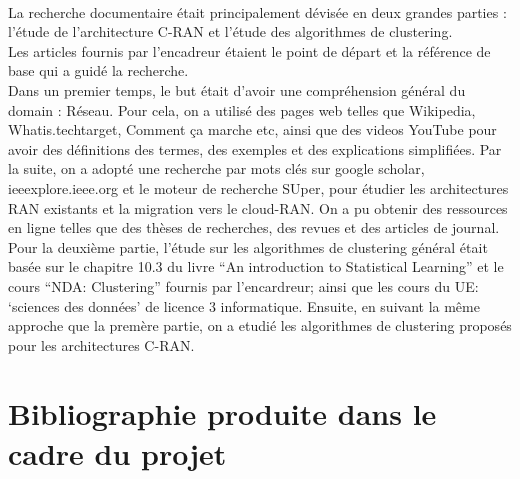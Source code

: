 \documentclass{article}
\begin{document}
\paragraph{}
La recherche documentaire était principalement dévisée en deux grandes parties : 
l’étude de l’architecture C-RAN et l’étude des algorithmes de clustering.\\
Les articles fournis par l’encadreur étaient le point de départ et la référence 
de base qui a guidé la recherche. \\
Dans un premier temps, le but était d’avoir une compréhension général du domain : Réseau. 
Pour cela, on a utilisé des pages web telles que Wikipedia, Whatis.techtarget, Comment ça marche 
etc, ainsi que des videos YouTube pour avoir des définitions des termes, des exemples et des 
explications simplifiées. Par la suite, on a adopté une recherche par mots clés sur google 
scholar, ieeexplore.ieee.org et le moteur de recherche SUper, pour étudier les architectures 
RAN existants et la migration vers le cloud-RAN. On a pu obtenir des ressources en ligne telles 
que des thèses de recherches, des revues et des articles de journal.\\
Pour la deuxième partie, l’étude sur les algorithmes de clustering général était basée sur le chapitre 10.3 du livre “An introduction to Statistical Learning” et le cours “NDA: Clustering” fournis par l’encardreur; ainsi que les cours du UE: ‘sciences des données’ de licence 3 informatique. Ensuite, en suivant la même approche que la premère partie, on a etudié les algorithmes de clustering proposés pour les architectures C-RAN.
\section{Bibliographie produite dans le cadre du projet}
\end{document}
